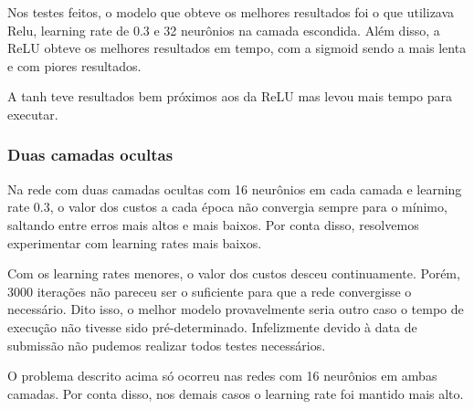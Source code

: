 \documentclass[conference]{IEEEtran}
\begin{document}
	Nos testes feitos, o modelo que obteve os melhores resultados foi o que utilizava Relu, learning rate de 0.3 e 32 neurônios na camada escondida. Além disso, a ReLU obteve os melhores resultados em tempo, com a sigmoid sendo a mais lenta e com piores resultados.
	
	A tanh teve resultados bem próximos aos da ReLU mas levou mais tempo para executar.

\subsubsection{Duas camadas ocultas}

	Na rede com duas camadas ocultas com 16 neurônios em cada camada e learning rate 0.3, o valor dos custos a cada época não convergia sempre para o mínimo, saltando entre erros mais altos e mais baixos. Por conta disso, resolvemos experimentar com learning rates mais baixos.
	
	Com os learning rates menores, o valor dos custos desceu continuamente. Porém, 3000 iterações não pareceu ser o suficiente para que a rede convergisse o necessário. Dito isso, o melhor modelo provavelmente seria outro caso o tempo de execução não tivesse sido pré-determinado. Infelizmente devido à data de submissão não pudemos realizar todos testes necessários.
	
	O problema descrito acima só ocorreu nas redes com 16 neurônios em ambas camadas. Por conta disso, nos demais casos o learning rate foi mantido mais alto.
\end{document}

